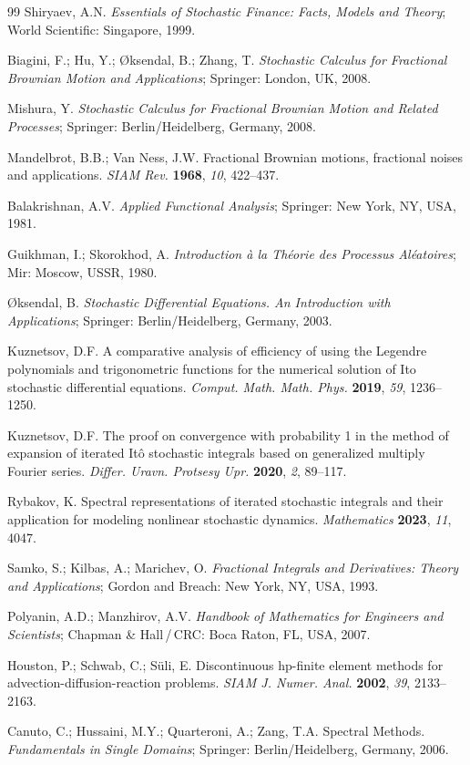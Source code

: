 \documentclass[10pt,reqno]{amsart}
\theoremstyle{plain}
\theoremstyle{remark}
\begin{document}
\begin{thebibliography}{99}
Shiryaev, A.N. {\em Essentials of Stochastic Finance: Facts, Models and Theory}; World Scientific: Singapore, 1999.

Biagini, F.; Hu, Y.; {\O}ksendal, B.; Zhang, T. {\em Stochastic Calculus for Fractional Brownian Motion and Applications}; Springer: London, UK, 2008.

Mishura, Y. {\em Stochastic Calculus for Fractional Brownian Motion and Related Processes}; Springer: Berlin/Heidelberg, Germany, 2008.

Mandelbrot, B.B.; Van Ness, J.W. Fractional Brownian motions, fractional noises and applications. {\em SIAM Rev.} {\bf 1968}, {\em 10}, 422--437.

Balakrishnan, A.V. {\em Applied Functional Analysis}; Springer: New York, NY, USA, 1981.

Guikhman, I.; Skorokhod, A. {\em Introduction \`{a} la Th\'{e}orie des Processus Al\'{e}atoires}; Mir: Moscow, USSR, 1980.

{\O}ksendal, B. {\em Stochastic Differential Equations. An Introduction with Applications}; Springer: Berlin/Heidelberg, Germany, 2003.

Kuznetsov, D.F. A comparative analysis of efficiency of using the Legendre polynomials and trigonometric functions for the numerical solution of Ito stochastic differential equations. {\em Comput. Math. Math. Phys.} {\bf 2019}, {\em 59}, 1236--1250.

Kuznetsov, D.F. The proof on convergence with probability 1 in the method of expansion of iterated It\^{o} stochastic integrals based on generalized multiply Fourier series. {\em Differ. Uravn. Protsesy Upr.} {\bf 2020}, {\em 2}, 89--117.

Rybakov, K. Spectral representations of iterated stochastic integrals and their application for modeling nonlinear stochastic dynamics. {\em Mathematics} {\bf 2023}, {\em 11}, 4047.

Samko, S.; Kilbas, A.; Marichev, O. {\em Fractional Integrals and Derivatives: Theory and Applications}; Gordon and Breach: New York, NY, USA, 1993.

Polyanin, A.D.; Manzhirov, A.V. {\em Handbook of Mathematics for Engineers and Scientists}; Chapman \& Hall\,/\,CRC: Boca Raton, FL, USA, 2007.

Houston, P.; Schwab, C.; S\"{u}li, E. Discontinuous hp-finite element methods for advection-diffusion-reaction problems. {\em SIAM J. Numer. Anal.} {\bf 2002}, {\em 39}, 2133--2163.

Canuto, C.; Hussaini, M.Y.; Quarteroni, A.; Zang, T.A. Spectral Methods. {\em Fundamentals in Single Domains}; Springer: Berlin/Heidelberg, Germany, 2006.

\end{thebibliography}
\end{document}
